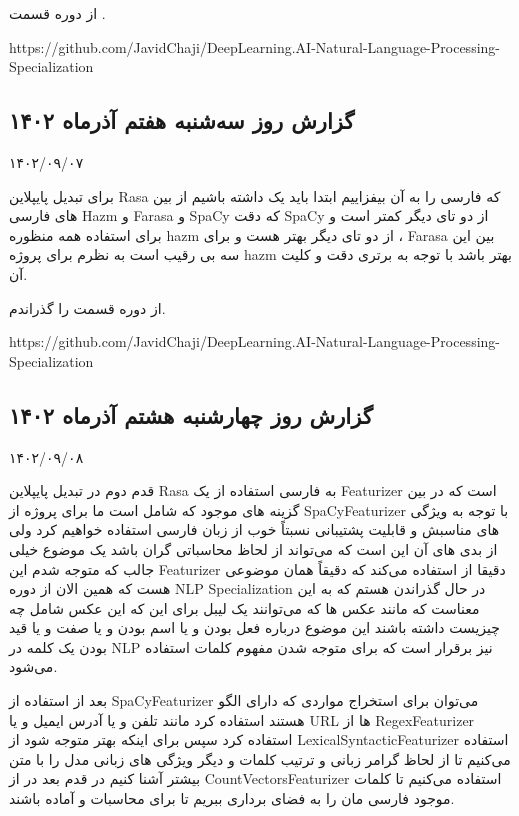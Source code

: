 از دوره  قسمت .

https://github.com/JavidChaji/DeepLearning.AI-Natural-Language-Processing-Specialization



\subsection{گزارش روز سه‌شنبه هفتم آذرماه ۱۴۰۲}

۱۴۰۲/۰۹/۰۷

برای تبدیل پایپلاین Rasa که فارسی را به آن بیفزاییم ابتدا باید یک  داشته باشیم از بین  های فارسی Hazm و Farasa و SpaCy که دقت SpaCy از دو تای دیگر کمتر است و برای استفاده همه منظوره hazm از دو تای دیگر بهتر هست و برای ، Farasa بین این سه بی رقیب است
به نظرم برای پروژه hazm بهتر باشد با توجه به برتری دقت و کلیت آن.

از دوره  قسمت  را گذراندم.

https://github.com/JavidChaji/DeepLearning.AI-Natural-Language-Processing-Specialization


\subsection{گزارش روز چهارشنبه هشتم آذرماه ۱۴۰۲}

۱۴۰۲/۰۹/۰۸

قدم دوم در تبدیل پایپلاین Rasa به فارسی استفاده از یک Featurizer است که در بین گزینه های موجود که شامل  است ما برای پروژه از SpaCyFeaturizer با توجه به ویژگی های مناسبش و قابلیت پشتیبانی نسبتاً خوب از زبان فارسی استفاده خواهیم کرد ولی از بدی های آن این است که می‌تواند از لحاظ محاسباتی گران باشد یک موضوع خیلی جالب که متوجه شدم این Featurizer دقیقا از  استفاده می‌کند که دقیقاً همان موضوعی هست که همین الان از دوره NLP Specialization در حال گذراندن هستم که به این معناست که مانند عکس ها که می‌توانند یک لیبل برای این که این عکس شامل چه چیزیست داشته باشند این موضوع درباره فعل بودن و یا اسم بودن و یا صفت و یا قید بودن یک کلمه در NLP نیز برقرار است که برای متوجه شدن مفهوم کلمات استفاده می‌شود. 

بعد از استفاده از SpaCyFeaturizer می‌توان برای استخراج مواردی که دارای الگو هستند استفاده کرد مانند تلفن و یا آدرس ایمیل و یا URL ها از RegexFeaturizer استفاده کرد
سپس برای اینکه  بهتر متوجه شود از LexicalSyntacticFeaturizer استفاده می‌کنیم تا از لحاظ گرامر زبانی و ترتیب کلمات و دیگر ویژگی های زبانی مدل را با متن بیشتر آشنا کنیم
در قدم بعد در  از CountVectorsFeaturizer استفاده می‌کنیم تا کلمات موجود فارسی مان را به فضای برداری ببریم تا برای محاسبات و  آماده باشند.

